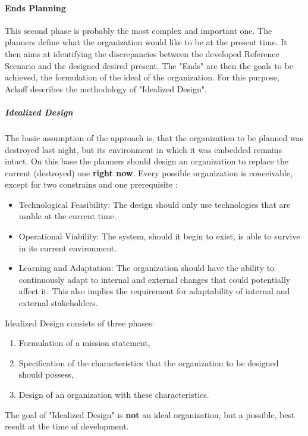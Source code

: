 \documentclass[
a4paper,
12pt
]{scrartcl}
\begin{document}
	
		\paragraph{Ends Planning} 
	
	This second phase is probably the most complex and important one. The planners define what the organization would like to be at the present time. It then aims at identifying the discrepancies between the developed Reference Scenario and the designed desired present. The "Ends" are then the goals to be achieved, the formulation of the ideal of the organization. 
	For this purpose, Ackoff describes the methodology of "Idealized Design".
	
	\subparagraph{Idealized Design}
	The basic assumption of the approach is, that the organization to be planned was destroyed last night, but its environment in which it was embedded remains intact. On this base the planners should design an organization to replace the current (destroyed) one \textbf{right now}.
	Every possible organization is conceivable, except for two constrains and one prerequisite \cite{ackoff:2001}:
	
	\begin{itemize}
		\item Technological Feasibility: The design should only use technologies that are usable at the current time.
		
		\item Operational Viability: The system, should it begin to exist, is able to survive in its current environment.
		
		\item Learning and Adaptation: The organization should have the ability to continuously adapt to internal and external changes that could potentially affect it. This also implies  the requirement for adaptability of internal and external stakeholders.
	\end{itemize}

Idealized Design consists of three phases:

\begin{enumerate}
	\item Formulation of a mission statement,
	\item Specification of the characteristics that the organization to be designed should possess,
	\item Design of an organization with these characteristics.
\end{enumerate}

\noindent The goal of "Idealized Design" is \textbf{not} an ideal organization, but a possible, best result at the time of development.
\end{document}
